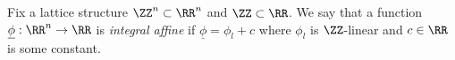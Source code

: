 

    Fix a lattice structure $\ZZ^n\subset \RR^n$ and $\ZZ\subset \RR$. 
    We say that a function $\underline \phi: \RR^n\to \RR$ is \emph{integral affine} if $\underline \phi= \phi_{l}+c$ where $\phi_{l}$ is $\ZZ$-linear and $c\in \RR$ is some constant. 

